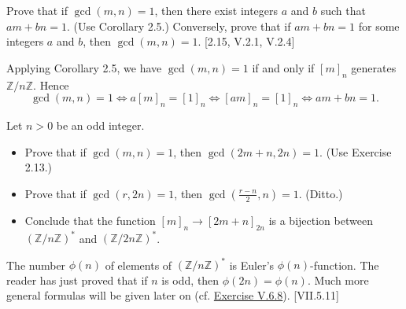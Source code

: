 \documentclass[12pt,letterpaper,boxed]{hmcpset}
\begin{document}
\hypertarget{Exercise II.2.13}{}
\begin{problem}[2.13]	
	Prove that if $\gcd(m, n) = 1$, then there exist integers $a$ and $b$ such that $am + bn = 1$. (Use Corollary 2.5.) Conversely, prove that if $am+ bn = 1$ for some integers $a$ and $b$, then $\gcd(m, n) = 1$. [2.15, \textsection V.2.1, V.2.4]
\end{problem}
\begin{solution}
	Applying Corollary 2.5, we have $\gcd(m, n) = 1$ if and only if $[m]_n$ generates $\mathbb{Z}/n\mathbb{Z}$. Hence
	\[
	\gcd(m, n) = 1\iff a[m]_n=[1]_n\iff [am]_n=[1]_n\iff am+ bn = 1.
	\]
\end{solution}
    


\begin{problem}[2.15]	
	Let $n > 0$ be an odd integer.
	\begin{itemize}
		\item Prove that if $\gcd(m, n) = 1$, then $\gcd(2m+ n, 2n) = 1$. (Use Exercise 2.13.)
		\item Prove that if $\gcd(r, 2n) = 1$, then $\gcd(\frac{r-n}{2}, n) = 1$. (Ditto.)		
		\item Conclude that the function $[m]_n\rightarrow[2m + n]_{2n}$ is a bijection between $(\mathbb{Z}/n\mathbb{Z})^*$ and $(\mathbb{Z}/2n\mathbb{Z})^*$. 
	\end{itemize}
	The number $\phi(n)$ of elements of $(\mathbb{Z}/n\mathbb{Z})^*$ is Euler’s $\phi(n)$-function. The reader has just	proved that if $n$ is odd, then $\phi(2n) = \phi(n)$. Much more general formulas will be given later on (cf. \hyperlink{Exercise V.6.8}{Exercise V.6.8}). [VII.5.11]
\end{problem}
\end{document}
